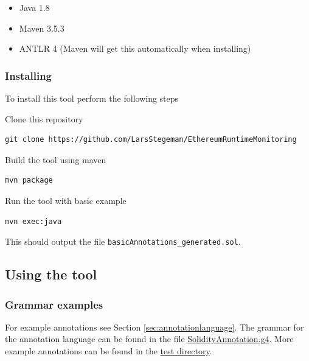 \documentclass[a4paper]{article}
\begin{document}
\begin{itemize}
\item
  Java 1.8
\item
  Maven 3.5.3
\item
  ANTLR 4 (Maven will get this automatically when installing)
\end{itemize}

\hypertarget{installing}{%
\subsubsection{Installing}\label{installing}}

To install this tool perform the following steps

Clone this repository

\begin{verbatim}
git clone https://github.com/LarsStegeman/EthereumRuntimeMonitoring
\end{verbatim}

Build the tool using maven

\begin{verbatim}
mvn package
\end{verbatim}

Run the tool with basic example

\begin{verbatim}
mvn exec:java
\end{verbatim}

This should output the file \texttt{basicAnnotations\_generated.sol}.

\hypertarget{using-the-tool}{%
\subsection{Using the tool}\label{using-the-tool}}

\hypertarget{grammar-examples}{%
\subsubsection{Grammar examples}\label{grammar-examples}}

For example annotations see Section \ref{sec:annotationlanguage}. The grammar for the annotation
language can be found in the file
\href{https://github.com/LarsStegeman/EthereumRuntimeMonitoring/blob/master/src/main/antlr4/SolidityAnnotated.g4}{SolidityAnnotation.g4}. More
example annotations can be found in the \href{https://github.com/LarsStegeman/EthereumRuntimeMonitoring/tree/master/src/test/contracts}{test
directory}.
\end{document}
